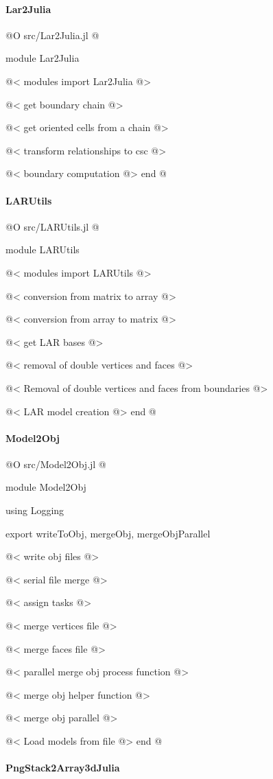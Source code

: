 \documentclass[11pt,oneside]{article}	%
\begin{document}
\paragraph{Lar2Julia}

@O src/Lar2Julia.jl
@{module Lar2Julia

@< modules import Lar2Julia @>

@< get boundary chain @>

@< get oriented cells from a chain @>

@< transform relationships to csc @>

@< boundary computation @>
end
@}

\paragraph{LARUtils}

@O src/LARUtils.jl
@{module LARUtils

@< modules import LARUtils @>

@< conversion from matrix to array @>

@< conversion from array to matrix @>

@< get LAR bases @>

@< removal of double vertices and faces @>

@< Removal of double vertices and faces from boundaries @>

@< LAR model creation @>
end
@}

\paragraph{Model2Obj}

@O src/Model2Obj.jl
@{module Model2Obj

using Logging

export writeToObj, mergeObj, mergeObjParallel

@< write obj files @>

@< serial file merge @>

@< assign tasks @>

@< merge vertices file @>

@< merge faces file @>

@< parallel merge obj process function @>

@< merge obj helper function @>

@< merge obj parallel @>

@< Load models from file @>
end
@}

\paragraph{PngStack2Array3dJulia}
\end{document}
